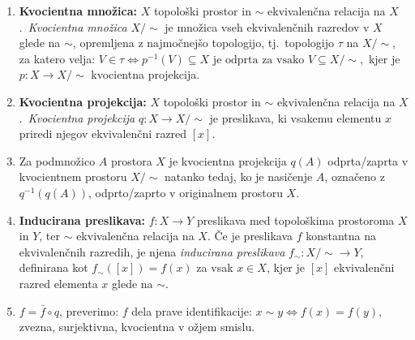 \documentclass[10pt,a4paper]{article}
\begin{document}
\begin{enumerate}
    
\item \textbf{Kvocientna množica:}  \(X\) topološki prostor in \(\sim\)
    ekvivalenčna relacija na \(X\).~\textit{Kvocientna množica} \(X/{\sim}\) je množica
    vseh ekvivalenčnih razredov v \(X\) glede na \(\sim\), opremljena z najmočnejšo
    topologijo, tj.~topologijo \(\tau\) na \(X/{\sim}\), za katero velja:
    $ V \in \tau \iff p^{-1}(V) \subseteq X \text{ je odprta za vsako } V
    \subseteq X/{\sim}, $ kjer je \(p: X \rightarrow X/{\sim}\) kvocientna projekcija.
    
\item \textbf{Kvocientna projekcija:}  \(X\) topološki prostor in \(\sim\)
    ekvivalenčna relacija na \(X\).~\textit{Kvocientna projekcija}
    \(q: X \rightarrow X/{\sim}\) je preslikava, ki vsakemu elementu \(x\) priredi
    njegov ekvivalenčni razred \([x]\).
    
\item Za podmnožico \(A\) prostora \(X\) je kvocientna projekcija \(q(A)\)
    odprta/zaprta v kvocientnem prostoru \(X/{\sim}\) natanko tedaj, ko je nasičenje
    \(A\), označeno z \(q^{-1}(q(A))\), odprto/zaprto v originalnem prostoru \(X\).
    
\item \textbf{Inducirana preslikava:}  \(f: X \rightarrow Y\) preslikava med
    topološkima prostoroma \(X\) in \(Y\), ter \(\sim\) ekvivalenčna relacija na \(X\).
    Če je preslikava $f$ konstantna na ekvivalenčnih razredih, je njena \textit{inducirana preslikava} 
		\(f_{\sim}: X/{\sim} \rightarrow Y\),
    definirana kot \(f_{\sim}([x]) = f(x)\) za vsak \(x \in X\), kjer je \([x]\)
    ekvivalenčni razred elementa \(x\) glede na \(\sim\).
    
\item $f = \bar{f} \circ q $, preverimo: $f$ dela prave identifikacije:
    $x \sim y \Leftrightarrow f(x) = f(y)$, zvezna, surjektivna,
    kvocientna v ožjem smislu.
    

\end{enumerate}
\end{document}
